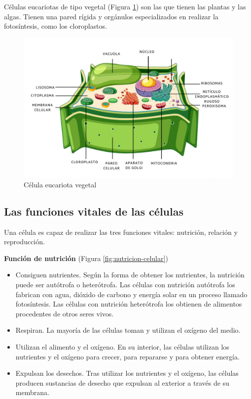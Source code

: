 \vspace{3mm}
Células eucariotas de tipo vegetal (Figura \ref{fig:eucariota-vegetal}) son las que tienen las plantas y las algas. Tienen una pared rígida y orgánulos especializados en realizar la fotosíntesis, como los cloroplastos.

\begin{figure}[!ht]
    \centering
    \includegraphics[width=0.7\linewidth]{Tema1/04_Celula_vegetal.jpg}
    \caption{Célula eucariota vegetal}
    \label{fig:eucariota-vegetal}
\end{figure}

\subsection{Las funciones vitales de las células}

Una célula es capaz de realizar las tres funciones vitales: nutrición, relación y reproducción.

\vspace{3mm}
\textbf{Función de nutrición} (Figura \ref{fig:nutricion-celular})

\begin{itemize}
    \item Consiguen nutrientes. Según la forma de obtener los nutrientes, la nutrición puede ser autótrofa o heterótrofa. Las células con nutrición autótrofa los fabrican con agua, dióxido de carbono y energía solar en un proceso llamado fotosíntesis. Las células con nutrición heterótrofa los obtienen de alimentos procedentes de otros seres vivos.
    \item Respiran. La mayoría de las células toman y utilizan el oxígeno del medio.
    \item Utilizan el alimento y el oxígeno. En su interior, las células utilizan los nutrientes y el oxígeno para crecer, para repararse y para obtener energía.
    \item Expulsan los desechos. Tras utilizar los nutrientes y el oxígeno, las células producen
sustancias de desecho que expulsan al exterior
a través de su membrana.
\end{itemize}

